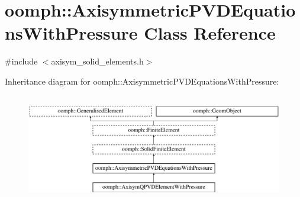 \hypertarget{classoomph_1_1AxisymmetricPVDEquationsWithPressure}{}\section{oomph\+:\+:Axisymmetric\+P\+V\+D\+Equations\+With\+Pressure Class Reference}
\label{classoomph_1_1AxisymmetricPVDEquationsWithPressure}


{\ttfamily \#include $<$axisym\+\_\+solid\+\_\+elements.\+h$>$}

Inheritance diagram for oomph\+:\+:Axisymmetric\+P\+V\+D\+Equations\+With\+Pressure\+:\begin{figure}[H]
\begin{center}
\leavevmode
\includegraphics[height=4.794520cm]{classoomph_1_1AxisymmetricPVDEquationsWithPressure}
\end{center}
\end{figure}
